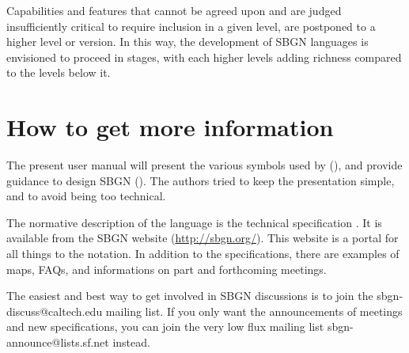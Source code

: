 Capabilities and features that cannot be agreed upon and are judged insufficiently critical to require inclusion in a given level, are postponed to a higher level or version.  In this way, the development of SBGN languages is envisioned to proceed in stages, with each higher levels adding richness compared to the levels below it.

\section{How to get more information}
\label{sec:info}

The present user manual will present the various symbols used by \SBGNPDLone (), and provide guidance to design SBGN \PDms (). The authors tried to keep the presentation simple, and to avoid being too technical. 

The normative description of the language is the technical specification \cite{Moodie:2011}. It is available from the SBGN website (\url{http://sbgn.org/}). This website is a portal for all things to the notation. In addition to the specifications, there are examples of maps, FAQs, and informations on part and forthcoming meetings.  

The easiest and best way to get involved in SBGN  discussions is to join the sbgn-discuss@caltech.edu mailing list. If you only want the announcements of meetings and new specifications, you can join the very low flux mailing list sbgn-announce@lists.sf.net instead.
